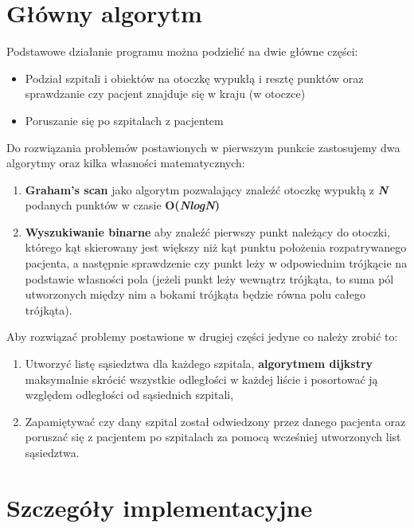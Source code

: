 \documentclass{article}
\begin{document}
\section{Główny algorytm}
Podstawowe działanie programu można podzielić na dwie główne części:
\begin{itemize}
\item Podział szpitali i obiektów na otoczkę wypukłą i resztę punktów oraz sprawdzanie czy pacjent znajduje się w kraju (w otoczce)
\item Poruszanie się po szpitalach z pacjentem
\end{itemize}
Do rozwiązania problemów postawionych w pierwszym punkcie zastosujemy dwa algorytmy oraz kilka własności matematycznych:
\begin{enumerate}
\item \textbf{Graham's scan } jako algorytm pozwalający znaleźć otoczkę wypukłą z \textbf{\textit{N}} podanych punktów w czasie \textbf{O(\textit{NlogN})}
\item \textbf{Wyszukiwanie binarne} aby znaleźć pierwszy punkt należący do otoczki, którego kąt skierowany jest większy niż kąt punktu położenia rozpatrywanego pacjenta, a następnie sprawdzenie czy punkt leży w odpowiednim trójkącie na podstawie własności pola (jeżeli punkt leży wewnątrz trójkąta, to suma pól utworzonych między nim a bokami trójkąta będzie równa polu całego trójkąta).
\end{enumerate}
Aby rozwiązać problemy postawione w drugiej części jedyne co należy zrobić to:
\begin{enumerate}
\item Utworzyć listę sąsiedztwa dla każdego szpitala, \textbf{algorytmem dijkstry} maksymalnie skrócić wszystkie odległości w każdej liście i posortować ją względem odległości od sąsiednich szpitali,
\item Zapamiętywać czy dany szpital został odwiedzony przez danego pacjenta oraz poruszać się z pacjentem po szpitalach za pomocą wcześniej utworzonych list sąsiedztwa.
\end{enumerate}

\newpage
\section{Szczegóły implementacyjne}
\end{document}

